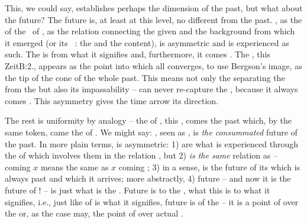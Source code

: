 \pa\label{pa:afterIsBefore}
This, we could say, establishes perhaps the dimension of the past, but what
about the future? The future is, at least at this level, no different from the
past. , as the  of the  \nexus\ of
, as the relation connecting the  given 
and the background from which it emerged (or its \equi\ : the
 and the  content), is asymmetric and is
experienced as such.  The  is  from what it
signifies and, furthermore, it comes .  The , this
\citet{strange crest of the time series}{Zeit}{B:2.}, appears as the
point into which all  converges, to use Bergson's image, as the
tip of the cone of the whole past.  This  means not only the
 {separating} the  from the  but
also its impassability --  can never re-capture the
, because it always comes . This asymmetry 
gives the time arrow its direction.

The rest is uniformity by analogy -- the  of , this
, comes  the past which, by the same token,
came  the  of . We might say: ,
seen as , is {\em the consummated} future of the past. In more plain
terms,  is asymmetric: 1)  are what is experienced through
the  of  which involves them in the relation
{}, but 2)  {\em is the same} relation as  --
 coming  $x$ means the same as $x$ coming 
; 3) in a sense,  is the future of its 
which is always past and  which it arrives; more abstractly, 4) future
-- and now it is the future of ! -- is just what is 
the .  Future is to the , what this
 is to what it signifies, i.e., just like  of 
is  what it signifies, future is  of the 
-- it is a point of  over the  or, as the
case may, the point of  over actual .

